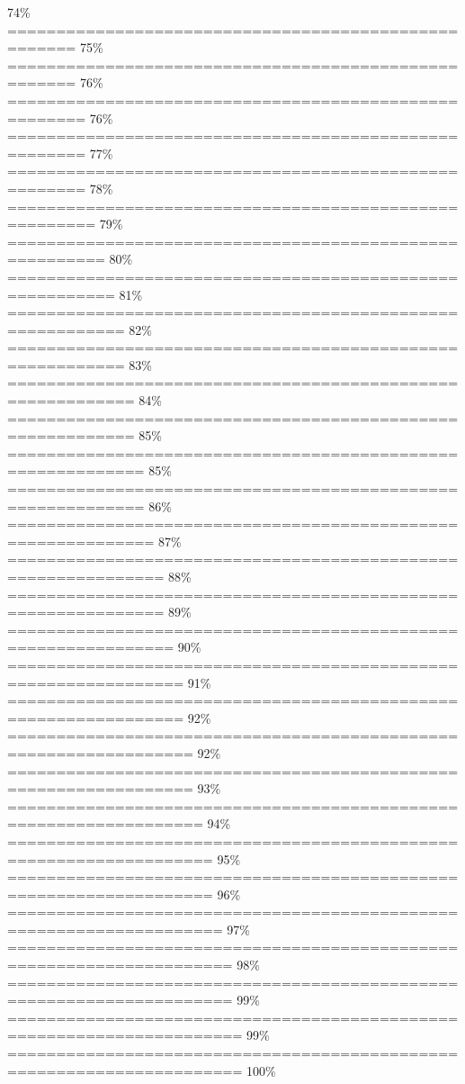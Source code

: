 \documentclass[
]{article}
\begin{document}
74\% \textbar{}
\textbar===================================================== \textbar{}
75\% \textbar{}
\textbar===================================================== \textbar{}
76\% \textbar{}
\textbar======================================================
\textbar{} 76\% \textbar{}
\textbar======================================================
\textbar{} 77\% \textbar{}
\textbar======================================================
\textbar{} 78\% \textbar{}
\textbar=======================================================
\textbar{} 79\% \textbar{}
\textbar========================================================
\textbar{} 80\% \textbar{}
\textbar=========================================================
\textbar{} 81\% \textbar{}
\textbar==========================================================
\textbar{} 82\% \textbar{}
\textbar==========================================================
\textbar{} 83\% \textbar{}
\textbar===========================================================
\textbar{} 84\% \textbar{}
\textbar===========================================================
\textbar{} 85\% \textbar{}
\textbar============================================================
\textbar{} 85\% \textbar{}
\textbar============================================================
\textbar{} 86\% \textbar{}
\textbar=============================================================
\textbar{} 87\% \textbar{}
\textbar==============================================================
\textbar{} 88\% \textbar{}
\textbar==============================================================
\textbar{} 89\% \textbar{}
\textbar===============================================================
\textbar{} 90\% \textbar{}
\textbar================================================================
\textbar{} 91\% \textbar{}
\textbar================================================================
\textbar{} 92\% \textbar{}
\textbar=================================================================
\textbar{} 92\% \textbar{}
\textbar=================================================================
\textbar{} 93\% \textbar{}
\textbar==================================================================
\textbar{} 94\% \textbar{}
\textbar===================================================================
\textbar{} 95\% \textbar{}
\textbar===================================================================
\textbar{} 96\% \textbar{}
\textbar====================================================================
\textbar{} 97\% \textbar{}
\textbar=====================================================================
\textbar{} 98\% \textbar{}
\textbar=====================================================================
\textbar{} 99\% \textbar{}
\textbar======================================================================\textbar{}
99\% \textbar{}
\textbar======================================================================\textbar{}
100\%
\end{document}
